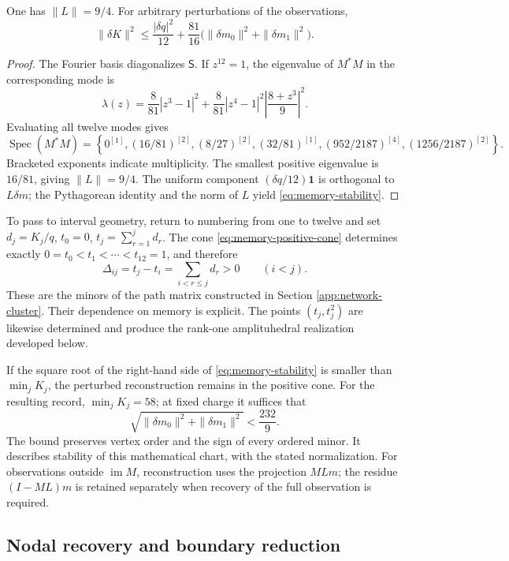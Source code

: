 \begin{proposition}
\label{prop:memory-stability}
One has \(\|L\|=9/4\). For arbitrary perturbations of the observations,
\begin{equation}
 \|\delta K\|^2\leq\frac{|\delta q|^2}{12}
 +\frac{81}{16}\bigl(\|\delta m_0\|^2+\|\delta m_1\|^2\bigr).
 \label{eq:memory-stability}
\end{equation}
\end{proposition}
\begin{proof}
The Fourier basis diagonalizes \(\mathsf S\). If \(z^{12}=1\),
the eigenvalue of \(M^*M\) in the corresponding mode is
\[
 \lambda(z)=\frac8{81}|z^3-1|^2
 +\frac8{81}|z^4-1|^2\left|\frac{8+z^3}{9}\right|^2.
\]
Evaluating all twelve modes gives
\[
 \operatorname{Spec}(M^*M)=
 \left\{0^{[1]},(16/81)^{[2]},(8/27)^{[2]},(32/81)^{[1]},
 (952/2187)^{[4]},(1256/2187)^{[2]}\right\}.
\]
Bracketed exponents indicate multiplicity. The smallest positive
eigenvalue is \(16/81\), giving \(\|L\|=9/4\). The uniform component
\((\delta q/12)\mathbf1\) is orthogonal to \(L\delta m\); the Pythagorean
identity and the norm of \(L\) yield \eqref{eq:memory-stability}.
\end{proof}

To pass to interval geometry, return to numbering from one to twelve
and set \(d_j=K_j/q\), \(t_0=0\),
\(t_j=\sum_{r=1}^j d_r\). The cone \eqref{eq:memory-positive-cone}
determines exactly \(0=t_0<t_1<\cdots<t_{12}=1\), and therefore
\[
 \Delta_{ij}=t_j-t_i=\sum_{i<r\leq j}d_r>0\qquad(i<j).
\]
These are the minors of the path matrix constructed in Section
\ref{app:network-cluster}. Their dependence on memory is
explicit. The points \((t_j,t_j^2)\) are likewise determined and
produce the rank-one amplituhedral realization developed below.

If the square root of the right-hand side of \eqref{eq:memory-stability} is smaller than
\(\min_j K_j\), the perturbed reconstruction remains in the positive cone.
For the resulting record, \(\min_jK_j=58\); at fixed charge it suffices that
\[
 \sqrt{\|\delta m_0\|^2+\|\delta m_1\|^2}<\frac{232}{9}.
\]
The bound preserves vertex order and the sign of every ordered
minor. It describes stability of this mathematical chart, with the
stated normalization. For observations outside \(\operatorname{im}M\),
reconstruction uses the projection \(MLm\); the residue
\((I-ML)m\) is retained separately when recovery of the full
observation is required.

\subsection{Nodal recovery and boundary reduction}

